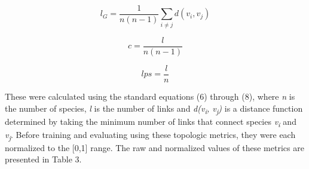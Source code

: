 \documentclass[letterpaper, 10 pt, conference]{ieeeconf}  %
\begin{document}
    \begin{equation} l_G = \frac{1}{n(n -1)}\sum_{i \neq j}d(v_i, v_j) \end{equation}
    
    \begin{equation} c = \frac{l}{n(n -1)} \end{equation}
    
    \begin{equation} lps = \frac{l}{n} \end{equation}
    
    These were calculated using the standard equations (6) through (8), where \textit{n} is the number of species, \textit{l} is the number of links and \textit{d(v\textsubscript{i}, v\textsubscript{j})} is a distance function determined by taking the minimum number of links that connect species \textit{v\textsubscript{i}} and \textit{v\textsubscript{j}}. Before training and evaluating using these topologic metrics, they were each normalized to the [0,1] range. The raw and normalized values of these metrics are presented in Table 3.
    
\end{document}
